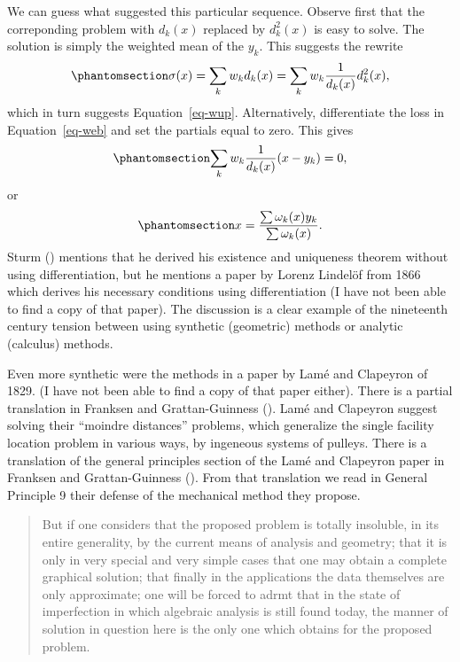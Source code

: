 \documentclass[
  12pt,
  letterpaper,
  DIV=11,
  numbers=noendperiod]{scrartcl}
\theoremstyle{definition}
\theoremstyle{plain}
\theoremstyle{plain}
\theoremstyle{plain}
\theoremstyle{definition}
\theoremstyle{remark}
\begin{document}
We can guess what suggested this particular sequence. Observe first that
the correponding problem with \(d_k(x)\) replaced by \(d_k^2(x)\) is
easy to solve. The solution is simply the weighted mean of the \(y_k\).
This suggests the rewrite \begin{equation}\phantomsection\label{eq-rew}{
\sigma(x)=\sum_k w_kd_k(x)=\sum_kw_k \frac{1}{d_k(x)}d_k^2(x),
}\end{equation} which in turn suggests Equation~\ref{eq-wup}.
Alternatively, differentiate the loss in Equation~\ref{eq-web} and set
the partials equal to zero. This gives
\begin{equation}\phantomsection\label{eq-wstatio1}{
\sum_k w_k\frac{1}{d_k(x)}(x-y_k)=0,
}\end{equation} or \begin{equation}\phantomsection\label{eq-wstatio2}{
x=\frac{\sum\omega_k(x)y_k}{\sum\omega_k(x)}.
}\end{equation} Sturm () mentions that he
derived his existence and uniqueness theorem without using
differentiation, but he mentions a paper by Lorenz Lindelöf from 1866
which derives his necessary conditions using differentiation (I have not
been able to find a copy of that paper). The discussion is a clear
example of the nineteenth century tension between using synthetic
(geometric) methods or analytic (calculus) methods.

Even more synthetic were the methods in a paper by Lamé and Clapeyron of
1829. (I have not been able to find a copy of that paper either). There
is a partial translation in Franksen and Grattan-Guinness
(). Lamé and Clapeyron
suggest solving their ``moindre distances'' problems, which generalize
the single facility location problem in various ways, by ingeneous
systems of pulleys. There is a translation of the general principles
section of the Lamé and Clapeyron paper in Franksen and Grattan-Guinness
(). From that
translation we read in General Principle 9 their defense of the
mechanical method they propose.

\begin{quote}
But if one considers that the proposed problem is totally insoluble, in
its entire generality, by the current means of analysis and geometry;
that it is only in very special and very simple cases that one may
obtain a complete graphical solution; that finally in the applications
the data themselves are only approximate; one will be forced to adrmt
that in the state of imperfection in which algebraic analysis is still
found today, the manner of solution in question here is the only one
which obtains for the proposed problem.
\end{quote}
\end{document}
